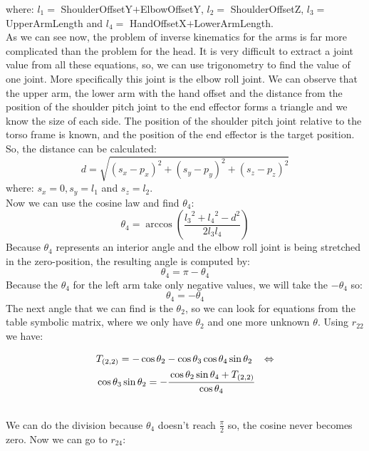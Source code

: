where: $l_1 =$ ShoulderOffsetY$+$ElbowOffsetY, $l_2 =$ ShoulderOffsetZ, $l_3 =$ UpperArmLength and $l_4 =$ HandOffsetX$+$LowerArmLength.\\
As we can see now, the problem of inverse kinematics for the arms is far more complicated than the problem for the head. It is very difficult to extract a joint value from all these equations, so, we can use trigonometry to find the value of one joint. More specifically this joint is the elbow roll joint. We can observe that the upper arm, the lower arm with the hand offset and the distance from the position of the shoulder pitch joint to the end effector forms a triangle and we know the size of each side. The position of the shoulder pitch joint relative to the torso frame is known, and the position of the end effector is the target position. So, the distance can be calculated:
\[
d=\sqrt{\left(s_x-p_x\right)^2 + \left(s_y-p_y\right)^2 + \left(s_z-p_z\right)^2}
\]
where: \(s_x = 0, s_y = l_1\) and \(s_z = l_2\).\\
Now we can use the cosine law and find \(\theta_4\):
\[
\theta_4 = \arccos\left(\frac{{l_3}^2 + {l_4}^2 - d^2}{2l_3l_4}\right)
\]
Because \(\theta_4\) represents an interior angle and the elbow roll joint is being stretched in the zero-position, the resulting angle is computed by:
\[
\theta_4 = \pi - \theta_4
\]
Because the \(\theta_4\) for the left arm take only negative values, we will take the \(-\theta_4\) so:
\[
\theta_4 = - \theta_4
\]
The next angle that we can find is the \(\theta_2\), so we can look for equations from the table symbolic matrix, where we only have \(\theta_2\) and one more unknown \(\theta\). Using $r_{22}$ we have:
\begin{small}
\begin{align*}
&T_{(2,2)} = -\cos\theta_2 - \cos\theta_3\cos\theta_4\sin\theta_2 &\Leftrightarrow\\
&\cos\theta_3\sin\theta_2 = -\cfrac{\cos\theta_2\sin\theta_4 + T_{(2,2)}}{\cos\theta_4}
\end{align*}
\end{small}\\
We can do the division because $\theta_4$ doesn't reach $\frac{\pi}{2} $ so, the cosine never becomes zero. Now we can go to $r_{24}$:
